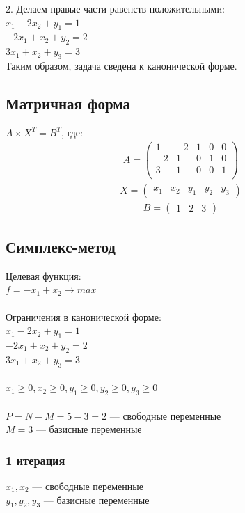 \documentclass[14pt,a4paper,fleqn]{extarticle}
\begin{document}
2. Делаем правые части равенств положительными:\\
$x_1 - 2x_2 + y_1 = 1$\\
$-2x_1 + x_2 + y_2 = 2$\\
$3x_1 + x_2 + y_3 = 3$\\

Таким образом, задача сведена к канонической форме.

\subsection*{Матричная форма}
$A \times X^T = B^T$, где:
\begin{align*}
	A = \begin{pmatrix}
		1 & -2 & 1 & 0 & 0\\
		-2 & 1 & 0 & 1 & 0\\
		3 & 1 & 0 & 0 & 1\\
		\end{pmatrix}
\end{align*}
\begin{align*}
	X = \begin{pmatrix}
		x_1 & x_2 & y_1 & y_2 & y_3
		\end{pmatrix}
\end{align*}
\begin{align*}
	B = \begin{pmatrix}
		1 & 2 & 3
	\end{pmatrix}
\end{align*}
\subsection*{Симплекс-метод}
Целевая функция:\\
$f = -x_1 + x_2 \longrightarrow max$\\\\
Ограничения в канонической форме:\\
$x_1 - 2x_2 + y_1 = 1$\\
$-2x_1 + x_2 + y_2 = 2$\\
$3x_1 + x_2 + y_3 = 3$\\\\
$x_1 \geq 0, x_2 \geq 0, y_1 \geq 0, y_2 \geq 0, y_3 \geq 0$\\\\
$P = N - M = 5 - 3 = 2$ --- свободные переменные\\
$M = 3$ --- базисные переменные
\subsubsection*{1 итерация}
$x_1, x_2$ --- свободные переменные\\
$y_1, y_2, y_3$ --- базисные переменные\\
\end{document}
